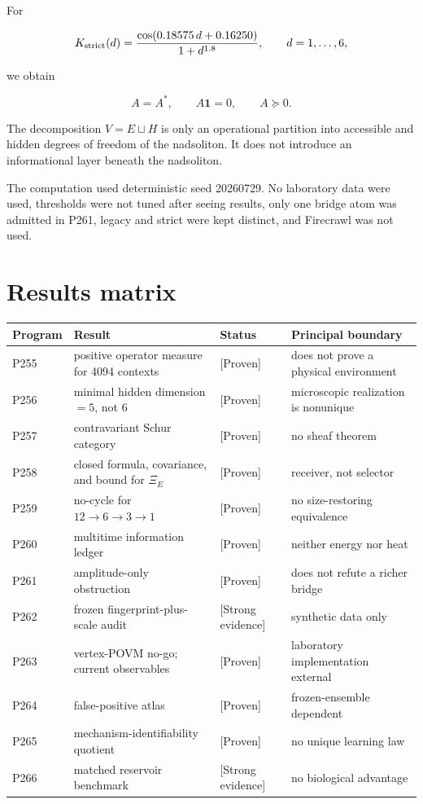 \documentclass[11pt,a4paper,openany]{report}
\newcommand{\statusProven}{\textcolor{fingreen}{[Proven]}}
\newcommand{\statusStrong}{\textcolor{finblue}{[Strong evidence]}}
\begin{document}
For

\[
K_{\rm strict}(d)
=
\frac{\cos(0.18575\,d+0.16250)}{1+d^{1.8}},
\qquad d=1,\ldots,6,
\]

we obtain

\[
A=A^\ast,\qquad A\mathbf1=0,\qquad A\succeq0.
\]

The decomposition \(V=E\sqcup H\) is only an operational partition into accessible and hidden degrees of freedom of the nadsoliton. It does not introduce an informational layer beneath the nadsoliton.

The computation used deterministic seed 20260729. No laboratory data were used, thresholds were not tuned after seeing results, only one bridge atom was admitted in P261, legacy and strict were kept distinct, and Firecrawl was not used.

\chapter{Results matrix}

\begin{center}
\begingroup\small
\setlength{\tabcolsep}{2.5pt}
\renewcommand{\arraystretch}{1.16}
\begin{longtable}{@{}p{}p{}p{}p{}@{}}
\toprule
\textbf{Program} & \textbf{Result} & \textbf{Status} & \textbf{Principal boundary} \\
\midrule
\endhead
P255 & positive operator measure for 4094 contexts & \statusProven{} & does not prove a physical environment \\
P256 & minimal hidden dimension \(=5\), not 6 & \statusProven{} & microscopic realization is nonunique \\
P257 & contravariant Schur category & \statusProven{} & no sheaf theorem \\
P258 & closed formula, covariance, and bound for \(\Xi_E\) & \statusProven{} & receiver, not selector \\
P259 & no-cycle for \(12\to6\to3\to1\) & \statusProven{} & no size-restoring equivalence \\
P260 & multitime information ledger & \statusProven{} & neither energy nor heat \\
P261 & amplitude-only obstruction & \statusProven{} & does not refute a richer bridge \\
P262 & frozen fingerprint-plus-scale audit & \statusStrong{} & synthetic data only \\
P263 & vertex-POVM no-go; current observables & \statusProven{} & laboratory implementation external \\
P264 & false-positive atlas & \statusProven{} & frozen-ensemble dependent \\
P265 & mechanism-identifiability quotient & \statusProven{} & no unique learning law \\
P266 & matched reservoir benchmark & \statusStrong{} & no biological advantage \\
\bottomrule
\end{longtable}
\endgroup
\end{center}
\end{document}
